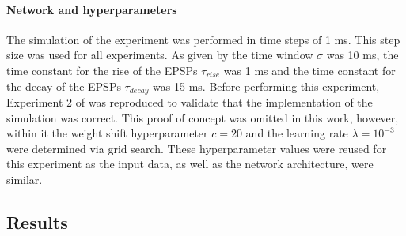 \paragraph{Network and hyperparameters}

The simulation of the experiment was performed in time steps of 1 ms. This step size was used for all experiments. As given by \citet{nessler} the time window $\sigma$ was 10 ms, the time constant for the rise of the EPSPs $\tau_{rise}$ was 1 ms and the time constant for the decay of the EPSPs $\tau_{decay}$ was 15 ms. Before performing this experiment, Experiment 2 of \citet{nessler} was reproduced to validate that the implementation of the simulation was correct. This proof of concept was omitted in this work, however, within it the weight shift hyperparameter $c = 20$ and the learning rate $\lambda = 10^{-3}$ were determined via grid search. These hyperparameter values were reused for this experiment as the input data, as well as the network architecture, were similar.

\subsection{Results}


